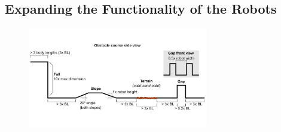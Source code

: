 \subsection{Expanding the Functionality of the Robots}
\begin{figure}[!t]
\centering
\includegraphics[width=0.7\textwidth]{sorocomp.pdf}
    \caption[]{}
    \label{fig:sorocomp}
\end{figure}
